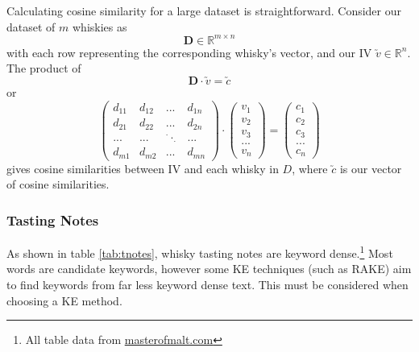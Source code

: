 Calculating cosine similarity for a large dataset is straightforward.
Consider our dataset of $m$ whiskies as
\begin{equation}
    \textbf{D} \in \mathbb{R}^{m \times n}
\end{equation}
with each row representing the corresponding whisky's vector, and our IV $\utilde{v} \in \mathbb{R}^{n}$.
The product of 
\begin{equation}
    \textbf{D} \cdot \utilde{v} = \utilde{c}    
\end{equation}
or 
\begin{equation}\label{eqn:cossim}
    \begin{pmatrix}
        d_{11} & d_{12} & ... & d_{1n}\\
        d_{21} & d_{22} & ... & d_{2n}\\
        ...    & ...    & ^{\cdot}\cdot _{\cdot} & ...   \\
        d_{m1} & d_{m2} & ... & d_{mn}
    \end{pmatrix}
    \cdot
    \begin{pmatrix}
        v_1 \\ v_2 \\ v_3 \\ ... \\ v_n
    \end{pmatrix}
    =
    \begin{pmatrix}
        c_1 \\ c_2 \\ c_3 \\ ... \\ c_n
    \end{pmatrix}
\end{equation}
gives cosine similarities between IV and each whisky in $D$, where $\utilde{c}$ is our vector of cosine similarities.




\subsubsection{Tasting Notes}\label{ssec:tnotes}
As shown in table \ref{tab:tnotes}, whisky tasting notes are keyword dense.\footnote{All table
data from \href{http://masterofmalt.com/}{masterofmalt.com}}
Most words are candidate keywords, however some KE techniques (such as RAKE) aim to 
find keywords from far less keyword dense text. This must be considered when choosing a KE method.

